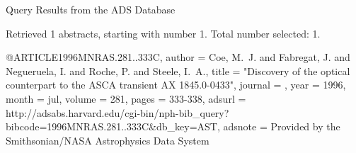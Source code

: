Query Results from the ADS Database


Retrieved 1 abstracts, starting with number 1.  Total number selected: 1.

@ARTICLE{1996MNRAS.281..333C,
   author = {{Coe}, M.~J. and {Fabregat}, J. and {Negueruela}, I. and {Roche}, P. and 
	{Steele}, I.~A.},
    title = "{Discovery of the optical counterpart to the ASCA transient AX 1845.0-0433}",
  journal = {\mnras},
     year = 1996,
    month = jul,
   volume = 281,
    pages = {333-338},
   adsurl = {http://adsabs.harvard.edu/cgi-bin/nph-bib_query?bibcode=1996MNRAS.281..333C&db_key=AST},
  adsnote = {Provided by the Smithsonian/NASA Astrophysics Data System}
}


